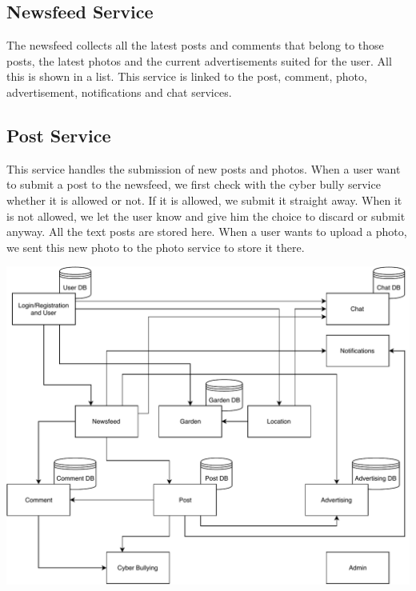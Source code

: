 \documentclass[a4paper,12pt]{article}
\begin{document}
\subsection{Newsfeed Service}

The newsfeed collects all the latest posts and comments that belong to those posts, the latest photos and the current advertisements suited for the user. All this is shown in a list. This service is linked to the post, comment, photo, advertisement, notifications and chat services.

\subsection{Post Service}

This service handles the submission of new posts and photos. When a user want to submit a post to the newsfeed, we first check with the cyber bully service whether it is allowed or not. If it is allowed, we submit it straight away. When it is not allowed, we let the user know and give him the choice to discard or submit anyway. All the text posts are stored here. When a user wants to upload a photo, we sent this new photo to the photo service to store it there.

\begin{adjustwidth}{-3cm}{}
\includegraphics[scale=1]{Microservices_architecture_final.pdf} 
\end{adjustwidth}
\end{document}
